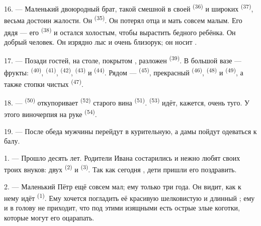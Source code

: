 16. --- Маленький двоюродный брат, такой смешной в своей 
\textsuperscript{(36)} и широких  \textsuperscript{(37)}, весьма
достоин жалости. Он  \textsuperscript{(35)}. Он потерял отца и
мать совсем малым. Его дядя --- его  \textsuperscript{(38)} и
остался холостым, чтобы вырастить бедного ребёнка. Он добрый человек. Он
изрядно лыс и очень близорук; он носит .

\VUsaut{2.4mm}
\VUsaut{3.0mm}

17. --- Позади гостей, на столе, покрытом , разложен
 \textsuperscript{(39)}. В большой вазе --- фрукты:
 \textsuperscript{(40)},  \textsuperscript{(41)},
 \textsuperscript{(42)},  \textsuperscript{(43)} и
 \textsuperscript{(44)}. Рядом --- 
\textsuperscript{(45)}, прекрасный  \textsuperscript{(46)},
 \textsuperscript{(48)} и 
\textsuperscript{(49)}, а также стопки чистых  \textsuperscript{(47)}.

18. ---  \textsuperscript{(50)} откупоривает 
\textsuperscript{(52)} старого вина  \textsuperscript{(51)}.
 \textsuperscript{(53)} идёт, кажется, очень туго. У этого
виночерпия на руке  \textsuperscript{(54)}.

19. --- После обеда мужчины перейдут в курительную, а дамы пойдут
одеваться к балу.

\VUsaut{5.0mm}
\VUsaut{1.6mm}
\VUsaut{2.6mm}

\VUsaut{3.0mm}

1. --- Прошло десять лет. Родители Ивана состарились и нежно любят своих
троих внуков: двух  \textsuperscript{(2)} и 
\textsuperscript{(3)}. Так как сегодня , дети пришли
его поздравить.

2. --- Маленький Пётр ещё совсем мал; ему только три года. Он видит, как
к нему идёт  \textsuperscript{(1)}. Ему хочется погладить её
красивую шелковистую  и длинный ; ему и в
голову не приходит, что под этими изящными  есть острые
злые коготки, которые могут его оцарапать.

